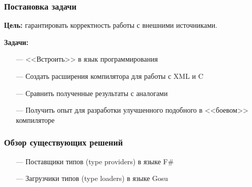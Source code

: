 \documentclass[12pt]{beamer}
\begin{document}
\begin{frame}\frametitle{Постановка задачи}
    \linespread{1.2}
    \textbf{Цель:} гарантировать корректность работы с внешними источниками.

    \textbf{Задачи:}
    \begin{itemize}
        \item[---] {<<Встроить>>} в язык программирования
        \item[---] Создать расширения компилятора для работы с XML и C
        \item[---] Сравнить полученные результаты с аналогами
        \item[---] Получить опыт для разработки улучшенного подобного в {<<боевом>>} компиляторе
    \end{itemize}


    \linespread{1}
\end{frame}

\begin{frame}\frametitle{Обзор существующих решений} %
    \begin{itemize}
        \item[---] Поставщики типов (type providers) в языке F\#
        \item[---] Загрузчики типов (type loaders) в языке Gosu
    \end{itemize}
\end{frame}
\end{document}
